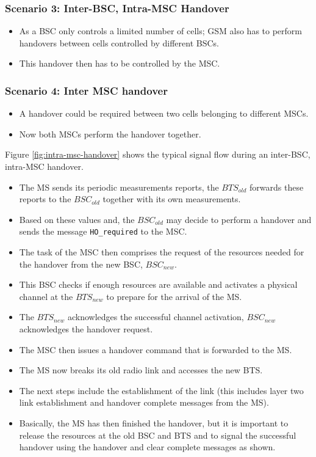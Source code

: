 \subsubsection[Inter-BSC, Intra-MSC Handover]{Scenario 3: Inter-BSC, Intra-MSC Handover}
\begin{itemize}
	\item As a BSC only controls a limited number of cells; GSM also has to perform handovers between cells controlled by different BSCs.
	\item This handover then has to be controlled by the MSC.
\end{itemize}

\subsubsection[Inter MSC handover]{Scenario 4: Inter MSC handover}
\begin{itemize}
	\item A handover could be required between two cells belonging to different MSCs. 
	\item Now both MSCs perform the handover together.
\end{itemize}


\noindent Figure \ref{fig:intra-msc-handover} shows the typical signal flow during an inter-BSC, intra-MSC handover. 

\begin{itemize}
	\item The MS sends its periodic measurements reports, the $ BTS_{old} $ forwards these reports to the $ BSC_{old} $ together with its own measurements. 
	\item Based on these values and, the $ BSC_{old} $ may decide to perform a handover and sends the message \verb*|HO_required| to the MSC. 
	\item The task of the MSC then comprises the request of the resources needed for the handover from the new BSC, $ BSC_{new} $. 
	\item This BSC checks if enough resources  are available and activates a physical channel at the $ BTS_{new} $ to prepare for the arrival of the MS.
	\item The $ BTS_{new} $ acknowledges the successful channel activation, $ BSC_{new} $ acknowledges the handover request. 
	\item The MSC then issues a handover command that is forwarded to the MS. 
	\item The MS now breaks its old radio link and accesses the new BTS. 
	\item The next steps include the establishment of the link (this includes layer two link establishment and handover complete messages from the MS). 
	\item Basically, the MS has then finished the handover, but it is important to release the resources at the old BSC and BTS and to signal the successful handover using the handover and clear complete messages as shown.
\end{itemize}



